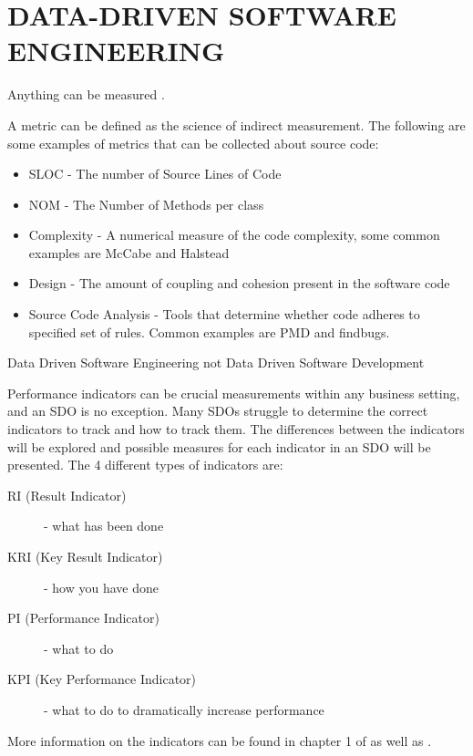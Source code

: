 \documentclass[SDSUThesis.tex]{subfiles}
\begin{document}
\section{DATA-DRIVEN SOFTWARE ENGINEERING}

Anything can be measured \cite{Hubbard2010}.

A metric can be defined as the science of indirect measurement.
    The following are some examples of metrics that can be collected 
    about source code:
    \begin{itemize}
        \item SLOC - The number of Source Lines of Code 
        \item NOM - The Number of Methods per class
        \item Complexity - A numerical measure of the code complexity,
            some common examples are McCabe \cite{McCabe1976} and 
            Halstead \cite{Halstead1977}
        \item Design - The amount of coupling and cohesion present 
        in the software code
        \item Source Code Analysis - Tools that determine whether 
        code adheres to specified set of rules. Common 
        examples are PMD and findbugs.
    \end{itemize}

Data Driven Software Engineering not Data Driven Software Development

Performance indicators can be crucial measurements
within any business setting, and an SDO is no exception. Many
SDOs struggle to determine the correct indicators to track and
how to track them.  
The differences between the indicators will be explored and
possible measures for each indicator in an SDO will be
presented.  The 4 different types of indicators are:
\begin{description}
  \item[RI (Result Indicator)] - what has been done
  \item[KRI (Key Result Indicator)] - how you have done
  \item[PI (Performance Indicator)] - what to do
  \item[KPI (Key Performance Indicator)] - what to do to dramatically increase performance
\end{description}

More information on the indicators can be found
in chapter 1 of \cite{parmenter2010}
as well as \cite{florac1999,kaplan1992}.
\end{document}
